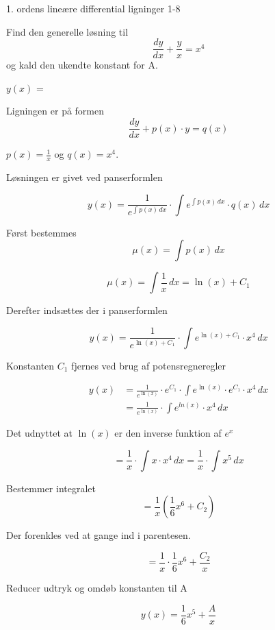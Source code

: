 \documentclass{article}
\begin{document}
\newpage

\begin{exercise}{1. ordens lineære differential ligninger 1-8}
	
	
	Find den generelle løsning til
	\[
	\frac{dy}{dx} +  \frac{y}{x} = x^4
	\]
	og kald den ukendte konstant for A.
	
	$y(x)$ =   
	
	
	
	\hint
	
	Ligningen er på formen
	\[
	\frac{dy}{dx} + p(x) \cdot y = q(x)
	\]
	
	\hint
	
	$p(x)=\frac{1}{x}$ og $q(x)=x^4$.
	
	\hint
	
	Løsningen er givet ved panserformlen
	
	
	\hint
	
	\[
	y(x) = \frac{1}{e^{\int p(x) \, dx}} \cdot \int e^{\int p(x) \, dx}  \cdot q(x) \, dx
	\]
	
	\hint
	
	Først bestemmes 
	\[
	\mu(x) = \int p(x) \, dx
	\]
	
	\hint
	\[
	\mu(x) = \int \frac{1}{x} \, dx = \ln(x)+ C_1
	\]
	
	\hint
	Derefter indsættes der i  panserformlen
	
	\hint
	
	\[
	y(x) = \frac{1}{e^{\ln(x) + C_1}} \cdot \int e^{\ln(x) + C_1}  \cdot x^4 \, dx
	\]
	
	
	\hint
	
	Konstanten $C_1$ fjernes ved brug af potensregneregler
	
	\hint
	\begin{align*}
	y(x) &= \frac{1}{e^{\ln(x)}} \cdot e^{C_1} \cdot \int e^{\ln(x)} \cdot e^{C_1}  \cdot x^4 \, dx  \\
	&= \frac{1}{e^{\ln(x)}} \cdot \int e^{ln(x)}  \cdot x^4 \, dx
	\end{align*}
	
	\hint
	
	Det udnyttet at $\ln(x)$ er den inverse funktion af $e^x$
	
	
	\hint
	\[
	= \frac{1}{x} \cdot \int x  \cdot x^4 \, dx =  \frac{1}{x} \cdot \int  x^5 \, dx
	\]
	
	\hint
	
	Bestemmer integralet
	\[
	= \frac{1}{x} \left( \frac{1}{6}x^6 + C_2    \right)
	\]
	
	\hint
	
	Der forenkles ved at gange ind i parentesen.
	
	\hint
	\[
	= \frac{1}{x} \cdot \frac{1}{6}x^6 + \frac{C_2}{x} 
	\]
	
	\hint
	
	Reducer udtryk og omdøb konstanten til A
	
	\hint
	\[
	y(x) =  \frac{1}{6}x^5 + \frac{A}{x}
	\]
	
	
\end{exercise}
\end{document}
